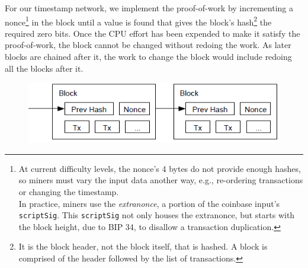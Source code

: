 \documentclass[nohyper]{tufte-handout}
\begin{document}
For our timestamp network, we implement the proof-of-work by
incrementing a nonce\footnote[][-1.3in]{At current difficulty levels, the nonce's 4 bytes do not provide enough hashes, so miners must vary the input data another way, e.g., re-ordering transactions or changing the timestamp.\\In practice, miners use the \emph{extranonce}, a portion of the coinbase input's \texttt{scriptSig}.  This \texttt{scriptSig} not only houses the extranonce, but starts with the block height, due to BIP 34, to disallow a transaction duplication. } in the block until a value is found that gives the
block's hash\footnote[][0.1in]{It is the block header, not the block itself, that is hashed.  A block is comprised of the header followed by the list of transactions.}
the required zero bits. Once the CPU effort has been
expended to make it satisfy the proof-of-work, the block cannot be
changed without redoing the work. As later blocks are chained after it,
the work to change the block would include redoing all the blocks after
it.



\begin{figure}[!h]
\centering
\includegraphics[width=0.75\linewidth]{proof-of-work.png}
\end{figure}
\end{document}
